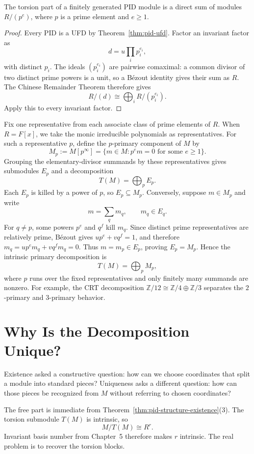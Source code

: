 \begin{proposition}
The torsion part of a finitely generated PID module is a direct sum of modules
\(R/(p^e)\), where \(p\) is a prime element and \(e\geq1\).
\end{proposition}
\begin{proof}
Every PID is a UFD by Theorem~\ref{thm:pid-ufd}. Factor an invariant factor as
\[
d=u\prod_i p_i^{e_i},
\]
with distinct \(p_i\). The ideals
\((p_i^{e_i})\) are pairwise comaximal: a common divisor of two distinct
prime powers is a unit, so a B\'ezout identity gives their sum as \(R\).
The Chinese Remainder Theorem therefore gives
\[R/(d)\cong\bigoplus_iR/(p_i^{e_i}).\]
Apply this to every invariant factor.
\end{proof}

Fix one representative from each associate class of prime elements of \(R\).
When \(R=F[x]\), we take the monic irreducible polynomials as representatives.
For such a representative \(p\), define the \(p\)-primary component of \(M\) by
\[
M_p:=M[p^\infty]
=\{m\in M:p^em=0\text{ for some }e\geq1\}.
\]
Grouping the elementary-divisor summands by these representatives gives
submodules \(E_p\) and a decomposition
\[
T(M)=\bigoplus_p E_p.
\]
Each \(E_p\) is killed by a power of \(p\), so
\(E_p\subseteq M_p\). Conversely, suppose \(m\in M_p\) and write
\[
m=\sum_qm_q,
\qquad m_q\in E_q.
\]
For \(q\ne p\), some powers \(p^e\) and \(q^f\) kill \(m_q\). Since
distinct prime representatives are relatively prime, B\'ezout gives
\(up^e+vq^f=1\), and therefore
\(m_q=up^em_q+vq^fm_q=0\). Thus \(m=m_p\in E_p\), proving
\(E_p=M_p\). Hence the intrinsic primary decomposition is
\[
T(M)=\bigoplus_p M_p,
\]
where \(p\) runs over the fixed representatives and only finitely many
summands are nonzero. For example, the CRT
decomposition \(\mathbb Z/12\cong\mathbb Z/4\oplus\mathbb Z/3\) separates
the \(2\)-primary and \(3\)-primary behavior.

\section{Why Is the Decomposition Unique?}
Existence asked a constructive question: how can we choose coordinates that
split a module into standard pieces?  Uniqueness asks a different question:
how can those pieces be recognized from \(M\) without referring to chosen
coordinates?

The free part is immediate from Theorem~\ref{thm:pid-structure-existence}(3).
The torsion submodule \(T(M)\) is intrinsic, so
\[
M/T(M)\cong R^r.
\]
Invariant basis number from Chapter~5 therefore makes \(r\) intrinsic.  The
real problem is to recover the torsion blocks.


